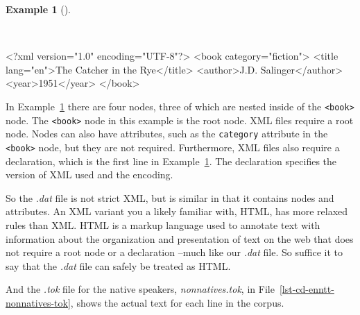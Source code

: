 \documentclass[
  letterpaper,
]{latex/krantz}
\newenvironment{Shaded}{\begin{snugshade}}{\end{snugshade}}
\newcommand{\FunctionTok}[1]{\textcolor[rgb]{0.00,0.00,0.00}{#1}}
\newcommand{\KeywordTok}[1]{\textcolor[rgb]{0.00,0.00,0.00}{#1}}
\newcommand{\NormalTok}[1]{\textcolor[rgb]{0.00,0.00,0.00}{#1}}
\newcommand{\OtherTok}[1]{\textcolor[rgb]{0.00,0.00,0.00}{#1}}
\newcommand{\StringTok}[1]{\textcolor[rgb]{0.00,0.00,0.00}{#1}}
\theoremstyle{definition}
\newtheorem{example}{Example}[chapter]
\theoremstyle{remark}
\begin{document}
\begin{example}[]\protect\hypertarget{exm-cd-xml}{}\label{exm-cd-xml}

~

\begin{Shaded}
\begin{Highlighting}[]
\FunctionTok{\textless{}?xml}\OtherTok{ version=}\StringTok{"1.0"}\OtherTok{ encoding=}\StringTok{"UTF{-}8"}\FunctionTok{?\textgreater{}}
\NormalTok{\textless{}}\KeywordTok{book}\OtherTok{ category=}\StringTok{"fiction"}\NormalTok{\textgreater{}}
\NormalTok{  \textless{}}\KeywordTok{title}\OtherTok{ lang=}\StringTok{"en"}\NormalTok{\textgreater{}The Catcher in the Rye\textless{}/}\KeywordTok{title}\NormalTok{\textgreater{}}
\NormalTok{  \textless{}}\KeywordTok{author}\NormalTok{\textgreater{}J.D. Salinger\textless{}/}\KeywordTok{author}\NormalTok{\textgreater{}}
\NormalTok{  \textless{}}\KeywordTok{year}\NormalTok{\textgreater{}1951\textless{}/}\KeywordTok{year}\NormalTok{\textgreater{}}
\NormalTok{\textless{}/}\KeywordTok{book}\NormalTok{\textgreater{}}
\end{Highlighting}
\end{Shaded}

\end{example}

In Example~\ref{exm-cd-xml} there are four nodes, three of which are
nested inside of the \texttt{\textless{}book\textgreater{}} node. The
\texttt{\textless{}book\textgreater{}} node in this example is the root
node. XML files require a root node. Nodes can also have attributes,
such as the \texttt{category} attribute in the
\texttt{\textless{}book\textgreater{}} node, but they are not required.
Furthermore, XML files also require a declaration, which is the first
line in Example~\ref{exm-cd-xml}. The declaration specifies the version
of XML used and the encoding.

So the \emph{.dat} file is not strict XML, but is similar in that it
contains nodes and attributes. An XML variant you a likely familiar
with, HTML, has more relaxed rules than XML. HTML is a markup language
used to annotate text with information about the organization and
presentation of text on the web that does not require a root node or a
declaration --much like our \emph{.dat} file. So suffice it to say that
the \emph{.dat} file can safely be treated as HTML.

And the \emph{.tok} file for the native speakers, \emph{nonnatives.tok},
in File~\ref{lst-cd-enntt-nonnatives-tok}, shows the actual text for
each line in the corpus.
\end{document}
